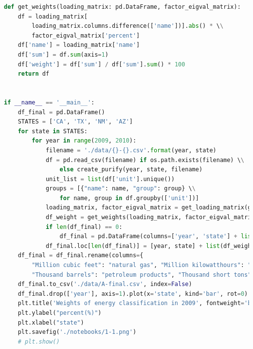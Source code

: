 \documentclass[a4paper,11pt]{article}
\begin{document}
\begin{appendices}
\begin{lstlisting}[language=Python, caption=profile.py]
def get_weights(loading_matrix: pd.DataFrame, factor_eigval_matrix):
    df = loading_matrix[
        loading_matrix.columns.difference(['name'])].abs() * \\
        factor_eigval_matrix['percent']
    df['name'] = loading_matrix['name']
    df['sum'] = df.sum(axis=1)
    df['weight'] = df['sum'] / df['sum'].sum() * 100
    return df


if __name__ == '__main__':
    df_final = pd.DataFrame()
    STATES = ['CA', 'TX', 'NM', 'AZ']
    for state in STATES:
        for year in range(2009, 2010):
            filename = './data/{}-{}.csv'.format(year, state)
            df = pd.read_csv(filename) if os.path.exists(filename) \\
                else create_purify(year, state, filename)
            unit_list = list(df['unit'].unique())
            groups = [{"name": name, "group": group} \\
                for name, group in df.groupby(['unit'])]
            loading_matrix, factor_eigval_matrix = get_loading_matrix(groups)
            df_weight = get_weights(loading_matrix, factor_eigval_matrix)
            if len(df_final) == 0:
                df_final = pd.DataFrame(columns=['year', 'state'] + list(df_weight['name']))
            df_final.loc[len(df_final)] = [year, state] + list(df_weight['weight'])
    df_final = df_final.rename(columns={
        "Million cubic feet": "natural gas", "Million kilowatthours": "electricity",
        "Thousand barrels": "petroleum products", "Thousand short tons": "coal"})
    df_final.to_csv('./data/A-final.csv', index=False)
    df_final.drop(['year'], axis=1).plot(x='state', kind='bar', rot=0)
    plt.title('Weights of energy classification in 2009', fontweight='bold')
    plt.ylabel("percent(%)")
    plt.xlabel("state")
    plt.savefig('./notebooks/1-1.png')
    # plt.show()

\end{lstlisting}
\end{appendices}
\end{document}
